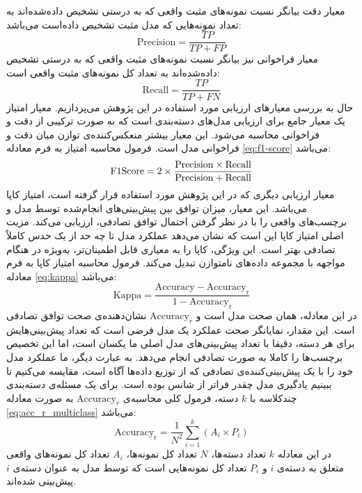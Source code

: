 معیار دقت بیانگر نسبت نمونه‌های مثبت واقعی که به درستی تشخیص داده‌شده‌اند به تعداد نمونه‌هایی که مدل مثبت تشخیص داده‌است می‌باشد:
\begin{equation}
    \mathrm{Precision}=\frac{TP}{TP+FP}
\end{equation}
معیار فراخوانی نیز بیانگر نسبت نمونه‌های مثبت واقعی که به درستی تشخیص داده‌شده‌اند به تعداد کل نمونه‌های مثبت واقعی است:
\begin{equation}
    \mathrm{Recall}=\frac{TP}{TP+FN}
\end{equation}
حال به بررسی معیارهای ارزیابی مورد استفاده در این پژوهش می‌پردازیم. معیار امتیاز 
یک معیار جامع برای ارزیابی مدل‌های دسته‌بندی است که به صورت ترکیبی از دقت و فراخوانی محاسبه می‌شود. این معیار بیشتر منعکس‌کننده‌ی توازن میان دقت و فراخوانی مدل است. فرمول محاسبه امتیاز  به فرم معادله \ref{eq:f1-score} می‌باشد:
\begin{equation}
    \mathrm{F1 \space Score}=2\times\frac{\mathrm{Precision}\times\mathrm{Recall}}{\mathrm{Precision}+\mathrm{Recall}}
    \label{eq:f1-score}
\end{equation}
معیار ارزیابی دیگری که در این پژوهش مورد استفاده قرار گرفته است، امتیاز کاپا می‌باشد. این معیار، میزان توافق بین پیش‌بینی‌های انجام‌شده توسط مدل و برچسب‌های واقعی را با در نظر گرفتن احتمال توافق تصادفی، ارزیابی می‌کند. مزیت اصلی امتیاز کاپا این است که نشان می‌دهد عملکرد مدل تا چه حد از یک حدس کاملاً تصادفی بهتر است. این ویژگی، کاپا را به معیاری قابل اطمینان‌تر، به‌ویژه در هنگام مواجهه با مجموعه داده‌های نامتوازن تبدیل می‌کند. فرمول محاسبه امتیاز کاپا به فرم معادله \ref{eq:kappa} می‌باشد:
\begin{equation}
\mathrm{Kappa} = \frac{\mathrm{Accuracy} - \mathrm{Accuracy_r}}{1 - \mathrm{Accuracy_r}}
\label{eq:kappa}
\end{equation}
در این معادله،
همان صحت مدل است و $\mathrm{Accuracy}_r$
نشان‌دهنده‌ی صحت توافق تصادفی است. این مقدار، نمایانگر صحت عملکرد یک مدل فرضی است که تعداد پیش‌بینی‌هایش برای هر دسته، دقیقا با تعداد پیش‌بینی‌های مدل اصلی ما یکسان است، اما این تخصیص برچسب‌ها را کاملا 
به صورت تصادفی انجام می‌دهد. به عبارت دیگر، ما عملکرد مدل خود را با یک پیش‌بینی‌کننده‌ی تصادفی که از توزیع داده‌ها آگاه است، مقایسه می‌کنیم تا ببینیم یادگیری مدل چقدر فراتر از شانس بوده است. برای یک مسئله‌ی دسته‌بندی چندکلاسه با $k$
دسته، فرمول کلی محاسبه‌ی $\mathrm{Accuracy}_r$
به صورت معادله \ref{eq:acc_r_multiclass} می‌باشد:
\begin{equation}
\mathrm{Accuracy_r} = \frac{1}{N^2} \sum_{i=1}^{k} (A_i \times P_i)
\label{eq:acc_r_multiclass}
\end{equation}
در این معادله $k$ تعداد دسته‌ها، $N$ تعداد کل نمونه‌ها، $A_i$ تعداد کل نمونه‌های واقعی متعلق به دسته‌ی $i$ و $P_i$
تعداد کل نمونه‌هایی است که توسط مدل به عنوان دسته‌ی $i$ پیش‌بینی شده‌اند.

